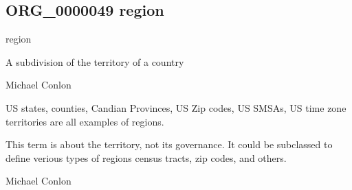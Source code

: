 \documentclass[letterpaper,10pt,english]{sphinxmanual}
\begin{document}
\subsection{ORG\_0000049 \sphinxhyphen{} region}
\label{\detokenize{doc-ORG_0000049:org-0000049-region}}\label{\detokenize{doc-ORG_0000049:index-0}}\label{\detokenize{doc-ORG_0000049::doc}}
\begin{sphinxShadowBox}

\sphinxAtStartPar
region
\end{sphinxShadowBox}

\begin{sphinxShadowBox}

\sphinxAtStartPar
{\hyperref[\detokenize{doc-ORG_0000045::doc}]{}}
\end{sphinxShadowBox}

\begin{sphinxShadowBox}

\sphinxAtStartPar
A subdivision of the territory of a country
\end{sphinxShadowBox}

\begin{sphinxShadowBox}

\sphinxAtStartPar
Michael Conlon 
\end{sphinxShadowBox}

\begin{sphinxShadowBox}

\sphinxAtStartPar
US states, counties, Candian Provinces, US Zip codes, US SMSAs, US time zone territories are all examples of regions.
\end{sphinxShadowBox}

\begin{sphinxShadowBox}

\sphinxAtStartPar
This term is about the territory, not its governance.  It could be subclassed to define verious types of regions \textendash{} census tracts, zip codes, and others.
\end{sphinxShadowBox}

\begin{sphinxShadowBox}

\sphinxAtStartPar
Michael Conlon 
\end{sphinxShadowBox}
\begin{quote}

\ignorespaces \end{quote}
\end{document}
